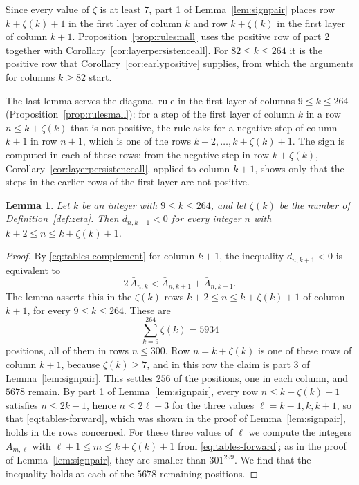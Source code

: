 \documentclass{amsart}
\newtheorem{lemma}[theorem]{Lemma}
\theoremstyle{definition}
\theoremstyle{remark}
\numberwithin{equation}{section}
\begin{document}
Since every value of $\zeta$ is at least $7$, part 1 of
Lemma~\ref{lem:signpair} places row
$k+\zeta(k)+1$ in the first layer of column $k$ and row $k+\zeta(k)$ in the
first layer of column $k+1$.
Proposition~\ref{prop:rulesmall} uses the positive row of part 2 together
with Corollary~\ref{cor:layerpersistenceall}. For
$82\le k\le264$ it is the positive row that
Corollary~\ref{cor:earlypositive} supplies, from which the arguments for
columns $k\ge82$ start.

The last lemma serves the diagonal rule in the first layer of columns
$9\le k\le264$ (Proposition~\ref{prop:rulesmall}): for a step of the first
layer of column $k$ in a row $n\le k+\zeta(k)$ that is not positive, the
rule asks for a negative step of column $k+1$ in row $n+1$, which
is one of the rows $k+2,\dots,k+\zeta(k)+1$. The sign is computed in each
of these rows: from the negative step in row $k+\zeta(k)$,
Corollary~\ref{cor:layerpersistenceall}, applied to column $k+1$, shows
only that the steps in the earlier rows of the first layer are not
positive.

\begin{lemma}\label{lem:nextcolumn}
Let $k$ be an integer with $9\le k\le264$, and let $\zeta(k)$ be the number
of Definition~\ref{def:zeta}. Then $d_{n,k+1}<0$ for every integer $n$ with
$k+2\le n\le k+\zeta(k)+1$.
\end{lemma}

\begin{proof}
By \eqref{eq:tables-complement} for column $k+1$, the inequality
$d_{n,k+1}<0$ is equivalent to
\[
2\,\bar A_{n,k}<\bar A_{n,k+1}+\bar A_{n,k-1}.
\]
The lemma asserts this in the $\zeta(k)$ rows $k+2\le n\le k+\zeta(k)+1$ of
column $k+1$, for every $9\le k\le264$. These are
\[
\sum_{k=9}^{264}\zeta(k)=5934
\]
positions, all of them in rows $n\le300$. Row $n=k+\zeta(k)$ is one of
these rows of column $k+1$, because $\zeta(k)\ge7$, and in this row the
claim is part 3 of Lemma~\ref{lem:signpair}. This settles $256$ of the
positions, one in each column, and $5678$ remain. By part 1 of
Lemma~\ref{lem:signpair}, every row $n\le k+\zeta(k)+1$ satisfies
$n\le2k-1$, hence $n\le2\ell+3$ for the three values $\ell=k-1,k,k+1$, so
that \eqref{eq:tables-forward}, which was shown in the proof of
Lemma~\ref{lem:signpair}, holds in the rows concerned. For these three
values of $\ell$ we compute the integers $\bar A_{m,\ell}$ with
$\ell+1\le m\le k+\zeta(k)+1$ from \eqref{eq:tables-forward}; as in the
proof of Lemma~\ref{lem:signpair}, they are smaller than $301^{299}$. We
find that the inequality holds at each of the $5678$ remaining positions.
\end{proof}
\end{document}
